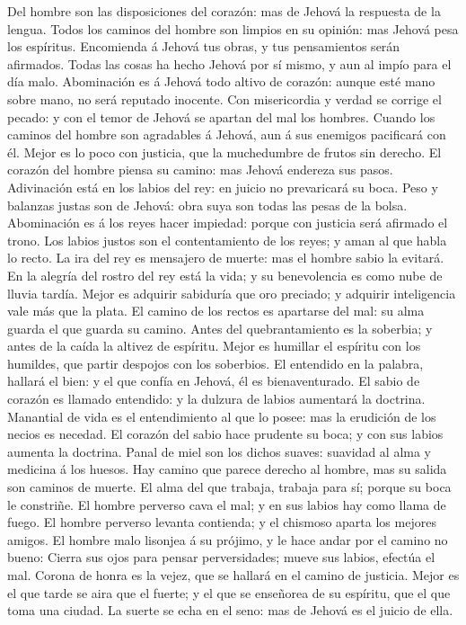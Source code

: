  Del hombre son las disposiciones del corazón: mas de
Jehová la respuesta de la lengua.  Todos los caminos del
hombre son limpios en su opinión: mas Jehová pesa los espíritus.
 Encomienda á Jehová tus obras, y tus pensamientos serán
afirmados.  Todas las cosas ha hecho Jehová por sí mismo,
y aun al impío para el día malo.  Abominación es á Jehová
todo altivo de corazón: aunque esté mano sobre mano, no será reputado
inocente.  Con misericordia y verdad se corrige el pecado:
y con el temor de Jehová se apartan del mal los hombres. 
Cuando los caminos del hombre son agradables á Jehová, aun á sus
enemigos pacificará con él.  Mejor es lo poco con
justicia, que la muchedumbre de frutos sin derecho.  El
corazón del hombre piensa su camino: mas Jehová endereza sus pasos.
 Adivinación está en los labios del rey: en juicio no
prevaricará su boca.  Peso y balanzas justas son de
Jehová: obra suya son todas las pesas de la bolsa. 
Abominación es á los reyes hacer impiedad: porque con justicia será
afirmado el trono.  Los labios justos son el
contentamiento de los reyes; y aman al que habla lo recto.
 La ira del rey es mensajero de muerte: mas el hombre
sabio la evitará.  En la alegría del rostro del rey está
la vida; y su benevolencia es como nube de lluvia tardía.
 Mejor es adquirir sabiduría que oro preciado; y adquirir
inteligencia vale más que la plata.  El camino de los
rectos es apartarse del mal: su alma guarda el que guarda su camino.
 Antes del quebrantamiento es la soberbia; y antes de la
caída la altivez de espíritu.  Mejor es humillar el
espíritu con los humildes, que partir despojos con los soberbios.
 El entendido en la palabra, hallará el bien: y el que
confía en Jehová, él es bienaventurado.  El sabio de
corazón es llamado entendido: y la dulzura de labios aumentará la
doctrina.  Manantial de vida es el entendimiento al que
lo posee: mas la erudición de los necios es necedad.  El
corazón del sabio hace prudente su boca; y con sus labios aumenta la
doctrina.  Panal de miel son los dichos suaves: suavidad
al alma y medicina á los huesos.  Hay camino que parece
derecho al hombre, mas su salida son caminos de muerte. 
El alma del que trabaja, trabaja para sí; porque su boca le constriñe.
 El hombre perverso cava el mal; y en sus labios hay como
llama de fuego.  El hombre perverso levanta contienda; y
el chismoso aparta los mejores amigos.  El hombre malo
lisonjea á su prójimo, y le hace andar por el camino no bueno:
 Cierra sus ojos para pensar perversidades; mueve sus
labios, efectúa el mal.  Corona de honra es la vejez, que
se hallará en el camino de justicia.  Mejor es el que
tarde se aira que el fuerte; y el que se enseñorea de su espíritu, que
el que toma una ciudad.  La suerte se echa en el seno:
mas de Jehová es el juicio de ella.

